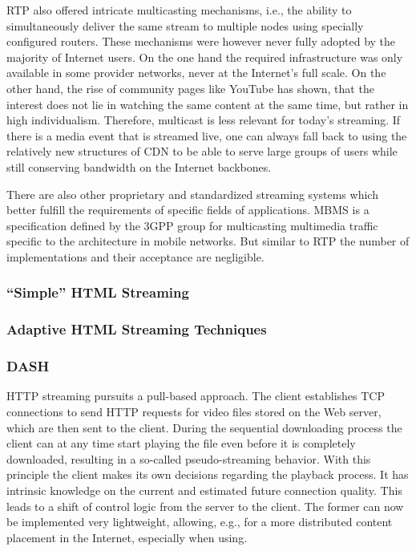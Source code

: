 RTP also offered intricate multicasting mechanisms, i.e., the ability to simultaneously deliver the same stream to multiple nodes using specially configured routers. These mechanisms were however never fully adopted by the majority of Internet users. On the one hand the required infrastructure was only available in some provider networks, never at the Internet's full scale. On the other hand, the rise of community pages like YouTube has shown, that the interest does not lie in watching the same content at the same time, but rather in high individualism. Therefore, multicast is less relevant for today's streaming. If there is a media event that is streamed live, one can always fall back to using the relatively new structures of \gls{CDN} to be able to serve large groups of users while still conserving bandwidth on the Internet backbones.

There are also other proprietary and standardized streaming systems which better fulfill the requirements of specific fields of applications. \gls{MBMS} \cite{3gpp22.146,3gpp22.246} is a specification defined by the 3GPP group for multicasting multimedia traffic specific to the architecture in mobile networks. But similar to \gls{RTP} the number of implementations and their acceptance are negligible.


\subsubsection{``Simple'' HTML Streaming}
\subsubsection{Adaptive HTML Streaming Techniques}
\subsubsection{\gls{DASH}}


\gls{HTTP} streaming pursuits a pull-based approach. The client establishes \gls{TCP} connections to send \gls{HTTP} requests for video files stored on the Web server, which are then sent to the client. During the sequential downloading process the client can at any time start playing the file even before it is completely downloaded, resulting in a so-called pseudo-streaming behavior.
With this principle the client makes its own decisions regarding the playback process. It has intrinsic knowledge on the current and estimated future connection quality. This leads to a shift of control logic from the server to the client. The former can now be implemented very lightweight, allowing, e.g., for a more distributed content placement in the Internet, especially when using.

